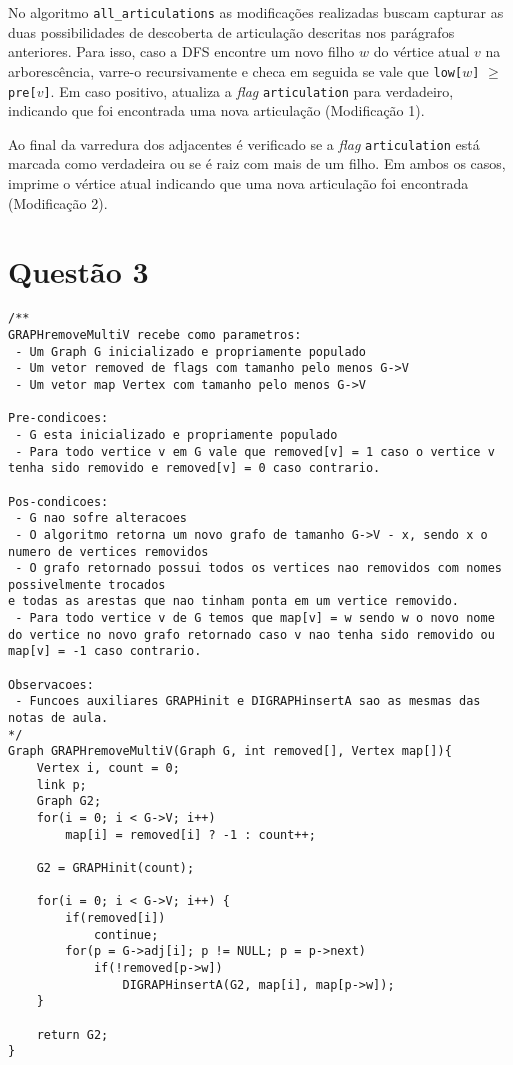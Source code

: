 \documentclass[12pt, a4paper, oneside]{article}
\begin{document}
No algoritmo \texttt{all\_articulations} as modificações realizadas buscam capturar as duas possibilidades
de descoberta de articulação descritas nos parágrafos anteriores. Para isso, caso a DFS
encontre um novo filho $w$ do vértice atual $v$ na arborescência, varre-o recursivamente e checa em seguida
se vale que \texttt{low[$w$]} $\ge$ \texttt{pre[$v$]}. Em caso positivo, atualiza a \emph{flag} \texttt{articulation}
para verdadeiro, indicando que foi encontrada uma nova articulação (Modificação 1).

Ao final da varredura dos adjacentes é verificado se a \emph{flag} \texttt{articulation} está marcada como verdadeira
ou se é raiz com mais de um filho. Em ambos os casos, imprime o vértice atual indicando que uma nova articulação foi
encontrada (Modificação 2).

\section*{Questão 3}
\begin{lstlisting}
/**
GRAPHremoveMultiV recebe como parametros:
 - Um Graph G inicializado e propriamente populado
 - Um vetor removed de flags com tamanho pelo menos G->V
 - Um vetor map Vertex com tamanho pelo menos G->V

Pre-condicoes:
 - G esta inicializado e propriamente populado
 - Para todo vertice v em G vale que removed[v] = 1 caso o vertice v
tenha sido removido e removed[v] = 0 caso contrario.

Pos-condicoes:
 - G nao sofre alteracoes
 - O algoritmo retorna um novo grafo de tamanho G->V - x, sendo x o
numero de vertices removidos
 - O grafo retornado possui todos os vertices nao removidos com nomes
possivelmente trocados
e todas as arestas que nao tinham ponta em um vertice removido.
 - Para todo vertice v de G temos que map[v] = w sendo w o novo nome
do vertice no novo grafo retornado caso v nao tenha sido removido ou
map[v] = -1 caso contrario.

Observacoes:
 - Funcoes auxiliares GRAPHinit e DIGRAPHinsertA sao as mesmas das
notas de aula.
*/
Graph GRAPHremoveMultiV(Graph G, int removed[], Vertex map[]){
	Vertex i, count = 0;
	link p;
	Graph G2;
	for(i = 0; i < G->V; i++)
		map[i] = removed[i] ? -1 : count++;
	
	G2 = GRAPHinit(count);
	
	for(i = 0; i < G->V; i++) {
		if(removed[i])
			continue;
		for(p = G->adj[i]; p != NULL; p = p->next)
			if(!removed[p->w])
				DIGRAPHinsertA(G2, map[i], map[p->w]);
	}
	
	return G2;
}
\end{lstlisting}
\end{document}
